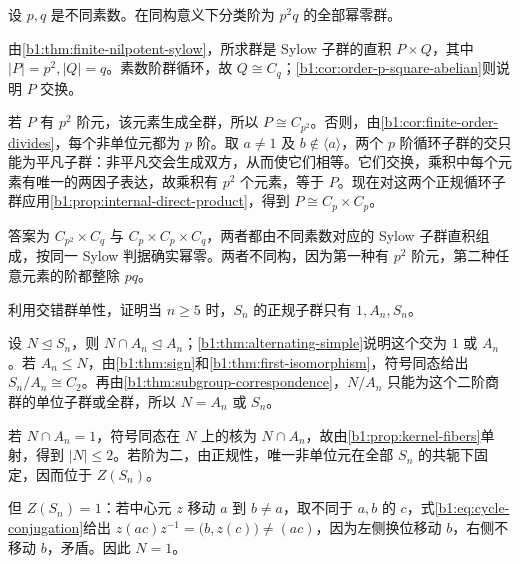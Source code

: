 \begin{exercise}\label{b1:ex:07-order-p2q}
	设 \(p,q\) 是不同素数。在同构意义下分类阶为 \(p^2q\) 的全部幂零群。
\end{exercise}
\begin{solution}
	由\cref{b1:thm:finite-nilpotent-sylow}，所求群是 Sylow 子群的直积 \(P\times Q\)，其中 \(|P|=p^2,|Q|=q\)。素数阶群循环，故 \(Q\cong C_q\)；\cref{b1:cor:order-p-square-abelian}则说明 \(P\) 交换。

	若 \(P\) 有 \(p^2\) 阶元，该元素生成全群，所以 \(P\cong C_{p^2}\)。否则，由\cref{b1:cor:finite-order-divides}，每个非单位元都为 \(p\) 阶。取 \(a\ne1\) 及 \(b\notin\langle a\rangle\)，两个 \(p\) 阶循环子群的交只能为平凡子群：非平凡交会生成双方，从而使它们相等。它们交换，乘积中每个元素有唯一的两因子表达，故乘积有 \(p^2\) 个元素，等于 \(P\)。现在对这两个正规循环子群应用\cref{b1:prop:internal-direct-product}，得到 \(P\cong C_p\times C_p\)。

	答案为 \(C_{p^2}\times C_q\) 与 \(C_p\times C_p\times C_q\)，两者都由不同素数对应的 Sylow 子群直积组成，按同一 Sylow 判据确实幂零。两者不同构，因为第一种有 \(p^2\) 阶元，第二种任意元素的阶都整除 \(pq\)。
\end{solution}

\begin{exercise}\label{b1:ex:07-normal-symmetric}
	利用交错群单性，证明当 \(n\ge5\) 时，\(S_n\) 的正规子群只有 \(1,A_n,S_n\)。
\end{exercise}
\begin{solution}
	设 \(N\trianglelefteq S_n\)，则 \(N\cap A_n\trianglelefteq A_n\)；\cref{b1:thm:alternating-simple}说明这个交为 \(1\) 或 \(A_n\)。若 \(A_n\le N\)，由\cref{b1:thm:sign}和\cref{b1:thm:first-isomorphism}，符号同态给出 \(S_n/A_n\cong C_2\)。再由\cref{b1:thm:subgroup-correspondence}，\(N/A_n\) 只能为这个二阶商群的单位子群或全群，所以 \(N=A_n\) 或 \(S_n\)。

	若 \(N\cap A_n=1\)，符号同态在 \(N\) 上的核为 \(N\cap A_n\)，故由\cref{b1:prop:kernel-fibers}单射，得到 \(|N|\le2\)。若阶为二，由正规性，唯一非单位元在全部 \(S_n\) 的共轭下固定，因而位于 \(Z(S_n)\)。

	但 \(Z(S_n)=1\)：若中心元 \(z\) 移动 \(a\) 到 \(b\ne a\)，取不同于 \(a,b\) 的 \(c\)，式\eqref{b1:eq:cycle-conjugation}给出 \(z(ac)z^{-1}=\bigl(b,z(c)\bigr)\ne(ac)\)，因为左侧换位移动 \(b\)，右侧不移动 \(b\)，矛盾。因此 \(N=1\)。
\end{solution}

